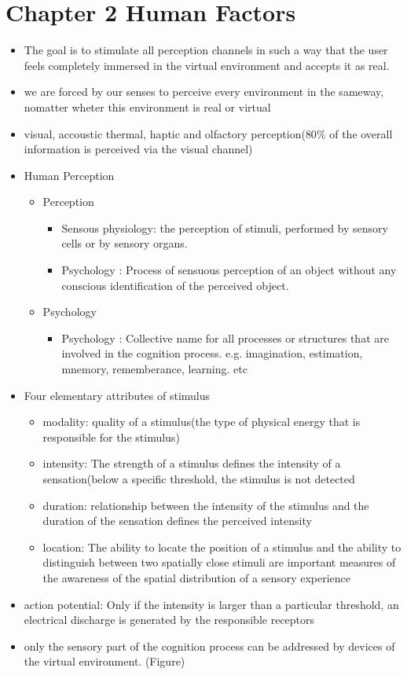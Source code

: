 \documentclass{standalone}
\begin{document}
\section{Chapter 2 Human Factors}
\begin{itemize}
	\item The goal is to stimulate all perception channels in such a way that the user feels completely immersed in the virtual environment and accepts it as real.
	\item we are forced by our senses to perceive every environment in the sameway, nomatter wheter this environment is real or virtual
	\item visual, accoustic thermal, haptic and olfactory perception($80 \%$ of the overall information is perceived via the visual channel)
	\item Human Perception
	\begin{itemize}
		\item Perception
		\begin{itemize}
			\item Sensous physiology: the perception of stimuli, performed by sensory cells or by sensory organs.
			\item Psychology : Process of sensuous perception of an object without any conscious identification of the perceived object.
		\end{itemize}
		\item Psychology
		\begin{itemize}
			\item Psychology : Collective name for all processes or structures that are involved in the cognition process. e.g. imagination, estimation, mnemory, rememberance, learning. etc
		\end{itemize}
	\end{itemize}
	\item Four elementary attributes of stimulus
	\begin{itemize}
		\item modality: quality of a stimulus(the type of physical energy that is responsible for the stimulus)
		\item intensity: The strength of a stimulus defines the intensity of a sensation(below a specific threshold, the stimulus is not detected
		\item duration: relationship between the intensity of the stimulus and the duration of the sensation defines the perceived intensity
		\item location: The ability to locate the position of a stimulus and the ability to distinguish between two spatially close stimuli are important measures of the awareness of the spatial distribution of a sensory experience
	\end{itemize}
	\item action potential: Only if the intensity is larger than a particular threshold, an electrical discharge is generated by the responsible receptors
	\item only the sensory part of the cognition process can be addressed by devices of the virtual environment. (Figure)
\end{itemize}
\end{document}
